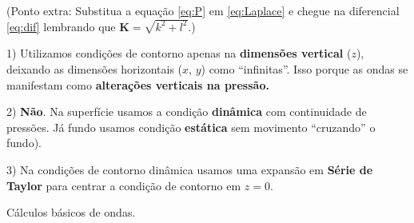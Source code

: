 \begin{parts}
  (Ponto extra: Substitua a equação \ref{eq:P} em \ref{eq:Laplace} e chegue na
  diferencial \ref{eq:dif} lembrando que $\mathbf{K} = \sqrt{k^2 + l^2}$.)

  \begin{solution}
    1) Utilizamos condições de contorno apenas na {\bf dimensões vertical}
    ($z$), deixando as dimensões horizontais ($x$, $y$) como ``infinitas''.
    Isso porque as ondas se manifestam como {\bf alterações verticais na
    pressão.}

    2) {\bf Não}.  Na superfície usamos a condição {\bf dinâmica} com
    continuidade de pressões.  Já fundo usamos condição {\bf estática} sem
    movimento ``cruzando'' o fundo).

    3) Na condições de contorno dinâmica usamos uma expansão em {\bf Série de
    Taylor} para centrar a condição de contorno em $z=0$.
  \end{solution}
\end{parts}

\question
Cálculos básicos de ondas.

